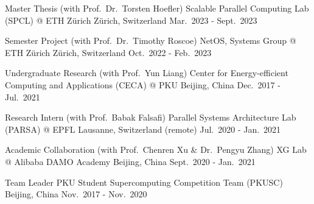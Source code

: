 

\begin{cventries}

  \cventry
    {Master Thesis (with Prof.\ Dr.\ Torsten Hoefler)} %
    {Scalable Parallel Computing Lab (SPCL) @ ETH Z\"urich} %
    {Z\"urich, Switzerland} %
    {Mar.\ 2023 - Sept.\ 2023} %
    {}

  \cventry
    {Semester Project (with Prof.\ Dr.\ Timothy Roscoe)} %
    {NetOS, Systems Group @ ETH Z\"urich} %
    {Z\"urich, Switzerland} %
    {Oct.\ 2022 - Feb.\ 2023} %
    {}

  \cventry
    {Undergraduate Research (with Prof.\ Yun Liang)} %
    {Center for Energy-efficient Computing and Applications (CECA) @ PKU} %
    {Beijing, China} %
    {Dec.\ 2017 - Jul.\ 2021} %
    {}

  \cventry
    {Research Intern (with Prof.\ Babak Falsafi)} %
    {Parallel Systems Architecture Lab (PARSA) @ EPFL} %
    {Lausanne, Switzerland (remote)} %
    {Jul.\ 2020 - Jan.\ 2021} %
    {}

  \cventry
    {Academic Collaboration (with Prof.\ Chenren Xu \& Dr.\ Pengyu Zhang)} %
    {XG Lab @ Alibaba DAMO Academy} %
    {Beijing, China} %
    {Sept.\ 2020 - Jan.\ 2021} %
    {}

  \cventry
    {Team Leader} %
    {PKU Student Supercomputing Competition Team (PKUSC)} %
    {Beijing, China} %
    {Nov.\ 2017 - Nov.\ 2020} %
    {}

\end{cventries}

